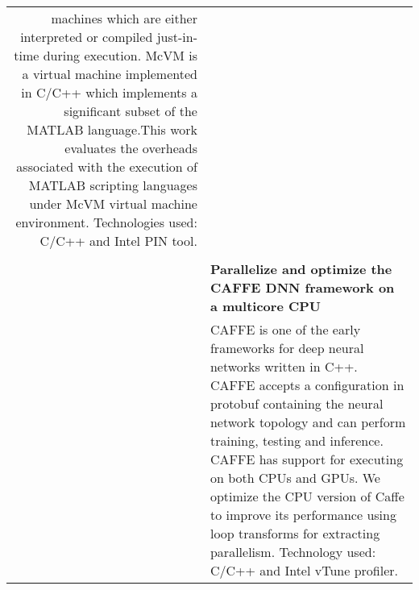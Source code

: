 \documentclass[a4paper,10pt]{article} %
\begin{document}
\begin{tabular}{rp{13cm}}
machines which are either interpreted or compiled just-in-time during
execution. McVM is a
virtual machine implemented in C/C++ which implements a significant subset of
the MATLAB language.This work evaluates the overheads associated with the execution of
MATLAB scripting languages under McVM virtual machine environment. Technologies used: C/C++ and Intel PIN tool.\\
& \\
& \textbf{Parallelize and optimize the CAFFE DNN framework on a multicore CPU}\\
& \setlength{\leftskip}{0.4cm}
CAFFE is one of the early frameworks for deep neural networks written in C++. CAFFE accepts a configuration in protobuf containing the neural network topology and can perform training, testing and inference. CAFFE has support for executing  on both CPUs and GPUs. We optimize the CPU version of Caffe to improve its performance using loop transforms for extracting parallelism. Technology used: C/C++ and Intel vTune profiler.\\

\end{tabular}
\end{document}
